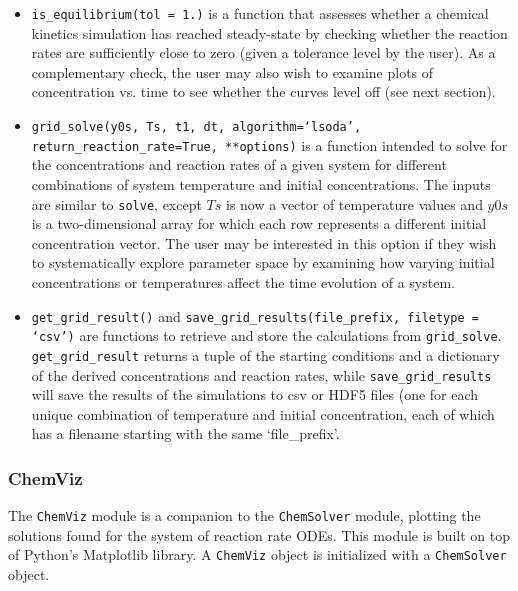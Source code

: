 \documentclass[12pt]{article}
\begin{document}
\begin{itemize}
\item \texttt{is\_equilibrium(tol = 1.)} is a function that assesses whether a chemical kinetics simulation has reached steady-state by checking whether the reaction rates are sufficiently close to zero (given a tolerance level by the user). As a complementary check, the user may also wish to examine plots of concentration vs. time to see whether the curves level off (see next section). 
\item \texttt{grid\_solve(y0s, Ts, t1, dt, algorithm=`lsoda', return\_reaction\_rate=True, **options)} is a function intended to solve for the concentrations and reaction rates of a given system for different combinations of system temperature and initial concentrations. The inputs are similar to \texttt{solve}, except $Ts$ is now a vector of temperature values and $y0s$ is a two-dimensional array for which each row represents a different initial concentration vector. The user may be interested in this option if they wish to systematically explore parameter space by examining how varying initial concentrations or temperatures affect the time evolution of a system. 
\item \texttt{get\_grid\_result()} and \texttt{save\_grid\_results(file\_prefix, filetype = `csv')} are functions to retrieve and store the calculations from \texttt{grid\_solve}. \texttt{get\_grid\_result} returns a tuple of the starting conditions and a dictionary of the derived concentrations and reaction rates, while \texttt{save\_grid\_results} will save the results of the simulations to csv or HDF5 files (one for each unique combination of temperature and initial concentration, each of which has a filename starting with the same `file\_prefix'. 
\end{itemize}

\subsubsection{ChemViz}
The \texttt{ChemViz} module is a companion to the \texttt{ChemSolver} module, plotting the solutions found for the system of reaction rate ODEs. This module is built on top of Python's Matplotlib library. A \texttt{ChemViz} object is initialized with a \texttt{ChemSolver} object. 
\end{document}
